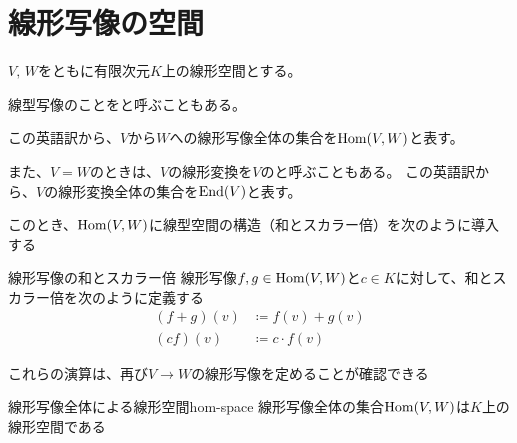 \documentclass[../../../topic_linear-algebra]{subfiles}
\begin{document}
\sectionline
\section{線形写像の空間}

$V,\,W$をともに有限次元$K$上の線形空間とする。

\br

線型写像のことをと呼ぶこともある。

この英語訳から、$V$から$W$への線形写像全体の集合を$\operatorname{Hom}(V,W)$と表す。

\br

また、$V=W$のときは、$V$の線形変換を$V$のと呼ぶこともある。
この英語訳から、$V$の線形変換全体の集合を$\operatorname{End}(V)$と表す。

\br

このとき、$\operatorname{Hom}(V,W)$に線型空間の構造（和とスカラー倍）を次のように導入する

\begin{definition}{線形写像の和とスカラー倍}\label{def:linear-map-addition-scalar}
  線形写像$f,g\in\operatorname{Hom}(V,W)$と$c\in K$に対して、和とスカラー倍を次のように定義する
  \begin{align*}
    (f+g)(v) & \coloneq f(v) + g(v) \\
    (cf)(v)  & \coloneq c\cdot f(v)
  \end{align*}
\end{definition}

\br

これらの演算は、再び$V \to W$の線形写像を定めることが確認できる

\begin{theorem}{線形写像全体による線形空間}{hom-space}
  線形写像全体の集合$\operatorname{Hom}(V,W)$は$K$上の線形空間である
\end{theorem}
\end{document}
